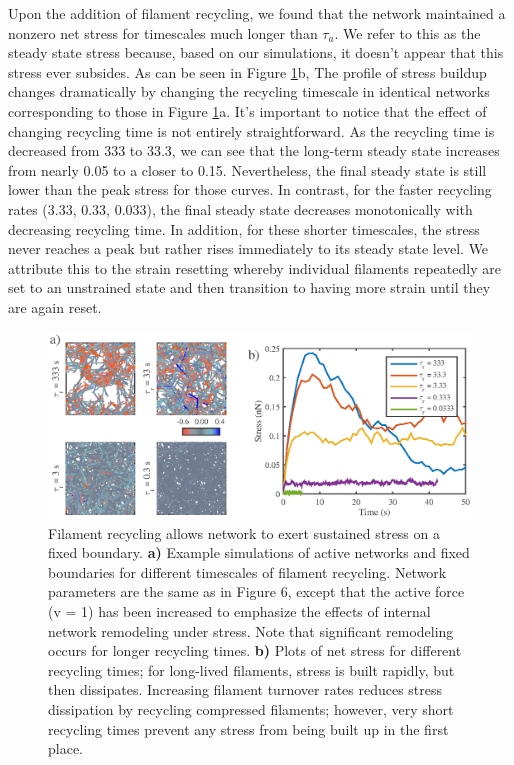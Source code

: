 \documentclass[10pt,letterpaper]{article}
\begin{document}
Upon the addition of filament recycling, we found that the network maintained a nonzero net stress for timescales much longer than $\tau_a$.  We refer to this as the steady state stress because, based on our simulations, it doesn't appear that this stress ever subsides.   As can be seen in Figure \ref{fig:active_rec}b, The profile of stress buildup changes dramatically by changing the recycling timescale in identical networks corresponding to those in Figure \ref{fig:active_rec}a.  It's important to notice that the effect of changing recycling time is not entirely straightforward.  As the recycling time is decreased from 333 to 33.3, we can see that the long-term steady state increases from nearly 0.05 to a closer to 0.15.  Nevertheless, the final steady state is still lower than the peak stress for those curves.  In contrast, for the faster recycling rates (3.33, 0.33, 0.033), the final steady state decreases monotonically with decreasing recycling time.  In addition, for these shorter timescales, the stress never reaches a peak but rather rises immediately to its steady state level.  We attribute this to the strain resetting whereby individual filaments repeatedly are set to an unstrained state and then transition to having more strain until they are again reset.


\begin{figure}[h!]
	\centering
	\includegraphics[width=\hsize]{figures/figure5b}
	\caption{\label{fig:active_rec}  Filament recycling allows network to exert sustained stress on a fixed boundary. \textbf{a)}  Example simulations of active networks and fixed boundaries for different timescales of filament recycling. Network parameters are the same as in Figure 6, except that the active force (v = 1) has been increased to emphasize the effects of internal network remodeling under stress. Note that significant remodeling occurs for longer recycling times.  \textbf{b)} Plots of net stress for different recycling times; for long-lived filaments, stress is built rapidly, but then dissipates.  Increasing filament turnover rates reduces stress dissipation by recycling compressed filaments; however, very short recycling times prevent any stress from being built up in the first place. }
\end{figure}
\end{document}
